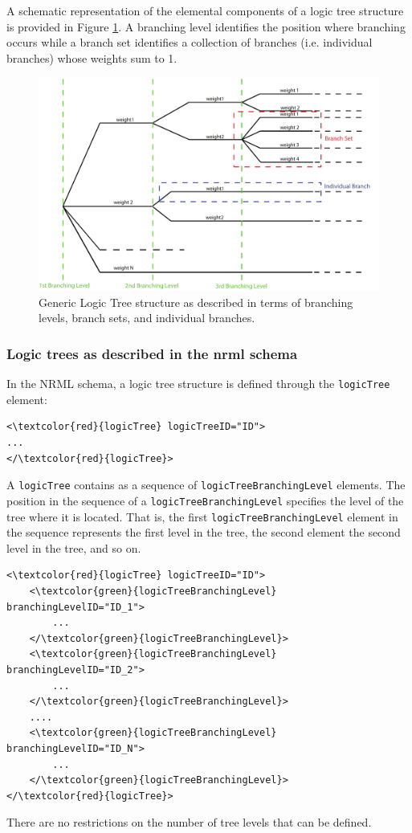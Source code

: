 A schematic representation of the elemental components of a logic tree 
structure is provided in Figure \ref{glts}. 
A branching level identifies the position where branching occurs while 
a branch set identifies a collection of branches (i.e. individual branches) 
whose weights sum to 1.
%
\begin{figure}[!ht]
\centering
\includegraphics[width=15cm]{figures/hazard/GenericLogicTreeStructure.pdf}
\caption{Generic Logic Tree structure as described in terms of branching 
levels, branch sets, and individual branches.}
\label{glts}
\end{figure}

\subsubsection{Logic trees as described in the nrml schema}
In the NRML schema, a logic tree structure is defined through the 
\Verb+logicTree+ element:
%
\begin{Verbatim}[frame=single, commandchars=\\\{\}]
<\textcolor{red}{logicTree} logicTreeID="ID">
...
</\textcolor{red}{logicTree}>
\end{Verbatim}
%
A \Verb+logicTree+ contains as a sequence of \Verb+logicTreeBranchingLevel+ 
elements.
The position in the sequence of a \Verb+logicTreeBranchingLevel+ specifies 
the level of the tree where it is located. That is, the first 
\texttt{logicTreeBranchingLevel} element in the sequence represents 
the first level in the tree, the second element the second level in
the tree, and so on.
%
\begin{Verbatim}[frame=single, commandchars=\\\{\}]
<\textcolor{red}{logicTree} logicTreeID="ID">
	<\textcolor{green}{logicTreeBranchingLevel} branchingLevelID="ID_1">
		...
	</\textcolor{green}{logicTreeBranchingLevel}>
	<\textcolor{green}{logicTreeBranchingLevel} branchingLevelID="ID_2">
		...
	</\textcolor{green}{logicTreeBranchingLevel}>
	....
	<\textcolor{green}{logicTreeBranchingLevel} branchingLevelID="ID_N">
		...
	</\textcolor{green}{logicTreeBranchingLevel}>
</\textcolor{red}{logicTree}>
\end{Verbatim}
There are no restrictions on the number of tree levels that can 
be defined.

